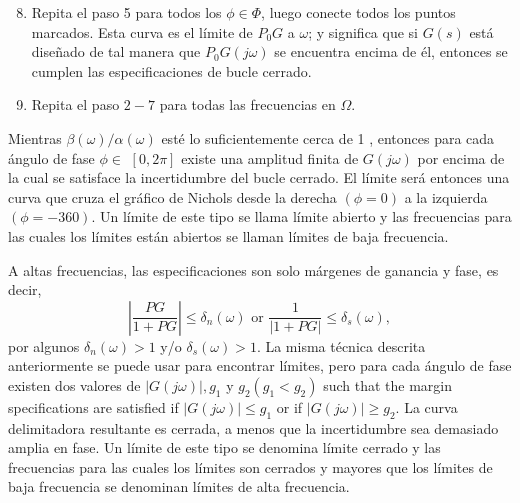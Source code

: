 \begin{enumerate}
  \setcounter{enumi}{7}
  \item Repita el paso 5 para todos los $\phi \in \Phi$, luego conecte todos los puntos marcados. Esta curva es el límite de $P_{0} G$ a $\omega$; y significa que si $G(s)$ está diseñado de tal manera que $P_{0} G(j \omega)$ se encuentra encima de él, entonces se cumplen las especificaciones de bucle cerrado.

  \item Repita el paso $2-7$ para todas las frecuencias en $\Omega$.

\end{enumerate}
Mientras $\beta(\omega) / \alpha(\omega)$ esté lo suficientemente cerca de 1 , entonces para cada ángulo de fase $\phi \in$ $[0,2 \pi]$ existe una amplitud finita de $G(j \omega)$ por encima de la cual se satisface la incertidumbre del bucle cerrado. El límite será entonces una curva que cruza el gráfico de Nichols desde la derecha $(\phi=0)$ a la izquierda $(\phi=-360)$. Un límite de este tipo se llama límite abierto y las frecuencias para las cuales los límites están abiertos se llaman límites de baja frecuencia.

A altas frecuencias, las especificaciones son solo márgenes de ganancia y fase, es decir,
$$
\left|\frac{P G}{1+P G}\right| \leq \delta_{n}(\omega) \text { or } \frac{1}{|1+P G|} \leq \delta_{s}(\omega),
$$
por algunos $\delta_{n}(\omega)>1$ y/o $\delta_{s}(\omega)>1$. La misma técnica descrita anteriormente se puede usar para encontrar límites, pero para cada ángulo de fase existen dos valores de $| G(j \omega)|, g_{1}$ y $g_{2}\left(g_{1}<g_{2}\right)$ such that the margin specifications are satisfied if $|G(j \omega)| \leq g_{1}$ or if $|G(j \omega)| \geq g_{2}$. La curva delimitadora resultante es cerrada, a menos que la incertidumbre sea demasiado amplia en fase. Un límite de este tipo se denomina límite cerrado y las frecuencias para las cuales los límites son cerrados y mayores que los límites de baja frecuencia se denominan límites de alta frecuencia.

